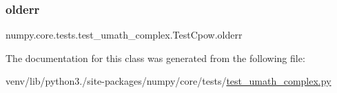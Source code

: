 \subsubsection{\texorpdfstring{olderr}{olderr}}
{\footnotesize\ttfamily numpy.\+core.\+tests.\+test\+\_\+umath\+\_\+complex.\+Test\+Cpow.\+olderr}



The documentation for this class was generated from the following file\+:\begin{DoxyCompactItemize}
\item 
venv/lib/python3./site-\/packages/numpy/core/tests/\hyperlink{test__umath__complex_8py}{test\+\_\+umath\+\_\+complex.\+py}\end{DoxyCompactItemize}
